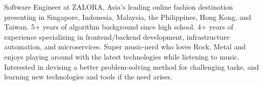 

\begin{cvparagraph}

Software Engineer at ZALORA, Asia’s leading online fashion destination presenting in Singapore, Indonesia, Malaysia, the Philippines, Hong Kong, and Taiwan. 5+ years of algorithm background since high school. 4+ years of experience specializing in frontend/backend development, infrastructure automation, and microservices. Super music-nerd who loves Rock, Metal and enjoys playing around with the latest technologies while listening to music. Interested in devising a better problem-solving method for challenging tasks, and learning new technologies and tools if the need arises.
\end{cvparagraph}
